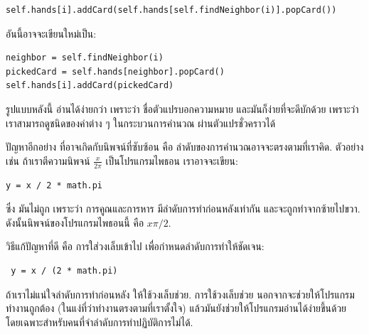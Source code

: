 \begin{verbatim}
self.hands[i].addCard(self.hands[self.findNeighbor(i)].popCard())
\end{verbatim}
%
อันนี้อาจจะเขียนใหม่เป็น:

\begin{verbatim}
neighbor = self.findNeighbor(i)
pickedCard = self.hands[neighbor].popCard()
self.hands[i].addCard(pickedCard)
\end{verbatim}
%
%
รูปแบบหลังนี้ อ่านได้ง่ายกว่า
เพราะว่า
ชื่อตัวแปรบอกความหมาย
และมันก็ง่ายที่จะดีบักด้วย
เพราะว่า เราสามารถดูชนิดของค่าต่าง ๆ ในกระบวนการคำนวณ ผ่านตัวแปรชั่วคราวได้


ปัญหาอีกอย่าง ที่อาจเกิดกับนิพจน์ที่ซับซ้อน
คือ ลำดับของการคำนวณอาจจะตรงตามที่เราคิด.
ตัวอย่างเช่น
ถ้าเราตีความนิพจน์
$\frac{x}{2 \pi}$ 
เป็นโปรแกรมไพธอน
เราอาจจะเขียน:

\begin{verbatim}
y = x / 2 * math.pi
\end{verbatim}
%
%
ซึ่ง มันไม่ถูก
เพราะว่า
การคูณและการหาร
มีลำดับการทำก่อนหลังเท่ากัน
และจะถูกทำจากซ้ายไปขวา.
ดังนั้นนิพจน์ของโปรแกรมไพธอนนี้ คือ $x \pi / 2$.


วิธีแก้ปัญหาที่ดี คือ
การใส่วงเล็บเข้าไป เพื่อกำหนดลำดับการทำให้ชัดเจน:

\begin{verbatim}
 y = x / (2 * math.pi)
\end{verbatim}
%
%
ถ้าเราไม่แน่ใจลำดับการทำก่อนหลัง
ให้ใช้วงเล็บช่วย.
การใช้วงเล็บช่วย
นอกจากจะช่วยให้โปรแกรมทำงานถูกต้อง (ในแง่ที่ว่าทำงานตรงตามที่เราตั้งใจ)
แล้วมันยังช่วยให้โปรแกรมอ่านได้ง่ายขึ้นด้วย
โดยเฉพาะสำหรับคนที่จำลำดับการทำปฏิบัติการไม่ได้.


